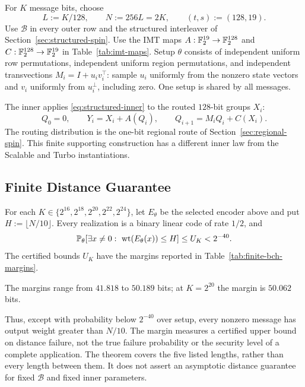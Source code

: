 For $K$ message bits, choose
\[
  L:=K/128,\qquad N:=256L=2K,\qquad (t,s):=(128,19).
\]
Use $\mathcal B$ in every outer row and the structured interleaver of
Section~\ref{sec:structured-spin}. Use the IMT maps
$A:\mathbb F_2^{19}\to\mathbb F_2^{128}$ and $C:\mathbb F_2^{128}\to\mathbb F_2^{19}$ in
Table~\ref{tab:imt-maps}.
Setup $\theta$ consists of
independent uniform row permutations, independent uniform region permutations,
and independent transvections $M_i=I+u_iv_i^\top$: sample $u_i$ uniformly
from the nonzero state vectors and $v_i$ uniformly from $u_i^\perp$,
including zero.
One setup is shared by all messages.

The inner applies \eqref{eq:structured-inner} to the routed $128$-bit
groups $X_i$:
\[
  Q_0=0,\qquad Y_i=X_i+A(Q_i),\qquad
  Q_{i+1}=M_iQ_i+C(X_i).
\]
The routing distribution is the one-bit regional route of
Section~\ref{sec:regional-spin}. This finite supporting construction
has a different inner law from the Scalable and Turbo instantiations.

\subsection{Finite Distance Guarantee}

\begin{samepage}
\begin{theorem}
\label{thm:finite-bch-spin}
\leavevmode\par
For each $K\in\{2^{16},2^{18},2^{20},2^{22},2^{24}\}$, let $E_\theta$ be
the selected encoder above and put $H:=\lfloor N/10\rfloor$.
Every realization is a binary linear code of rate $1/2$, and
\begin{equation}
  \mathbb P_\theta\!\left[
    \exists x\ne0:\ \operatorname{wt}(E_\theta(x))\le H
  \right]\le U_K<2^{-40}.
  \label{eq:finite-bch-distance}
\end{equation}
The certified bounds $U_K$ have the margins reported in
Table~\ref{tab:finite-bch-margins}.
\end{theorem}
\end{samepage}

The margins range from $41.818$ to $50.189$ bits; at $K=2^{20}$
the margin is $50.062$ bits.

Thus, except with probability below $2^{-40}$ over setup, every nonzero
message has output weight greater than $N/10$.
The margin measures a certified upper bound on distance failure, not the
true failure probability or the security level of a complete application.
The theorem covers the five listed lengths, rather than every length between
them. It does not assert an asymptotic distance guarantee for fixed
$\mathcal B$ and fixed inner parameters.


